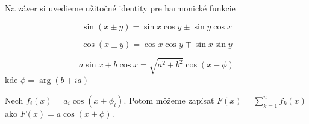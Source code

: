 Na záver si uvedieme užitočné identity pre harmonické funkcie
\begin{lema}
    \begin{equation}
        \sin(x\pm y) = \sin x \cos y \pm \sin y \cos x
    \end{equation}
\end{lema}

\begin{lema}
    \begin{equation}
        \cos(x\pm y) = \cos x \cos y \mp \sin x \sin y
    \end{equation}
\end{lema}

\begin{lema}
    \begin{equation}
        a \sin x + b \cos x = \sqrt{a^2 + b^2} \cos (x - \phi)
    \end{equation}
    kde $\phi = \arg (b + i a)$
    \label{lema:lk_sin_cos}
\end{lema}
\begin{lema}
    Nech $f_i(x) = a_i \cos (x + \phi_i)$.
    Potom môžeme zapísať $F(x) = \sum_{k=1}^n f_k(x)$ ako
    $F(x) = a \cos (x + \phi)$.
    \label{lema:lk_harmonickych_funkcii}
\end{lema}
